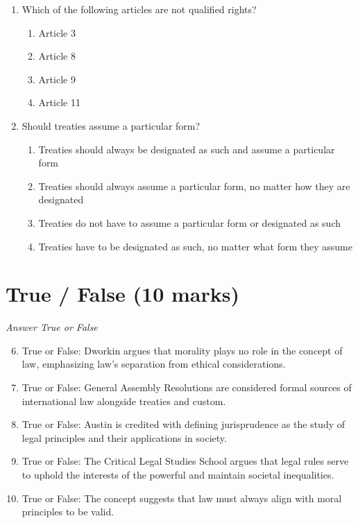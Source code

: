 \documentclass[12pt]{article}
\begin{document}
\begin{enumerate}[label=\arabic*.]
\begin{enumerate}[label=(\alph*)]
\end{enumerate}
\item Which of the following articles are not qualified rights?
\begin{enumerate}[label=(\alph*)]
    \item Article 3
    \item Article 8
    \item Article 9
    \item Article 11
\end{enumerate}
\item Should treaties assume a particular form?
\begin{enumerate}[label=(\alph*)]
    \item Treaties should always be designated as such and assume a particular form
    \item Treaties should always assume a particular form, no matter how they are designated
    \item Treaties do not have to assume a particular form or designated as such
    \item Treaties have to be designated as such, no matter what form they assume
\end{enumerate}
\end{enumerate}

\section*{True / False (10 marks)}
\textit{Answer True or False}
\begin{enumerate}[label=\arabic*.]
\setcounter{enumi}{5}
\item True or False: Dworkin argues that morality plays no role in the concept of law, emphasizing law's separation from ethical considerations.
\item True or False: General Assembly Resolutions are considered formal sources of international law alongside treaties and custom.
\item True or False: Austin is credited with defining jurisprudence as the study of legal principles and their applications in society.
\item True or False: The Critical Legal Studies School argues that legal rules serve to uphold the interests of the powerful and maintain societal inequalities.
\item True or False: The concept suggests that law must always align with moral principles to be valid.
\end{enumerate}
\end{document}
